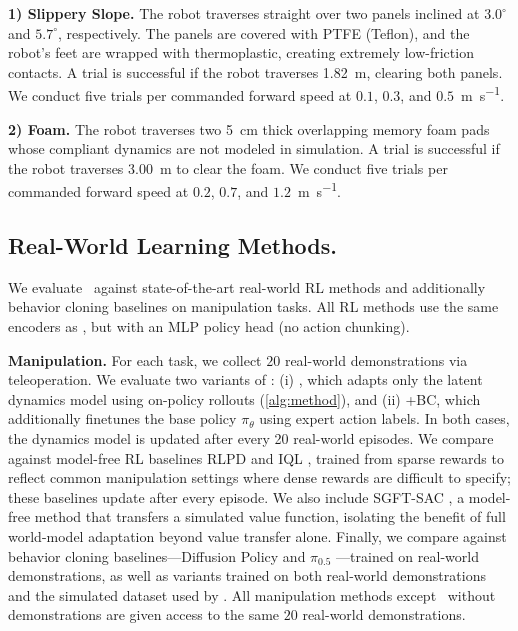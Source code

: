 \begin{hangingpar}
\textbf{1) Slippery Slope.} The robot traverses straight over two panels inclined at $3.0^\circ$ and $5.7^\circ$, respectively. The panels are covered with PTFE (Teflon), and the robot’s feet are wrapped with thermoplastic, creating extremely low-friction contacts. A trial is successful if the robot traverses \SI{1.82}{\meter}, clearing both panels. We conduct five trials per commanded forward speed at $0.1$, $0.3$, and $0.5$~\si{\meter\per\second}.
\end{hangingpar}

\begin{hangingpar}
\textbf{2) Foam.} The robot traverses two \SI{5}{\cm} thick overlapping memory foam pads whose compliant dynamics are not modeled in simulation. A trial is  successful if the robot traverses \SI{3.00}{\meter} to clear the foam. We conduct five trials per commanded forward speed at $0.2$, $0.7$, and $1.2$~\si{\meter\per\second}.
\end{hangingpar}

\subsection{Real-World Learning Methods.}

We evaluate \Method\ against state-of-the-art real-world RL methods and additionally behavior cloning baselines on manipulation tasks. All RL methods use the same encoders as \Method, but with an MLP policy head (no action chunking). 

\textbf{Manipulation.}
For each task, we collect $20$ real-world demonstrations via teleoperation. We evaluate two variants of \Method: (i) \Method, which adapts only the latent dynamics model using on-policy rollouts (\cref{alg:method}), and (ii) \Method+BC, which additionally finetunes the base policy $\pi_\theta$ using expert action labels. In both cases, the dynamics model is updated after every 20 real-world episodes. We compare against model-free RL baselines RLPD \cite{rlpd} and IQL \cite{kostrikovoffline}, trained from sparse rewards to reflect common manipulation settings where dense rewards are difficult to specify; these baselines update after every episode. We also include SGFT-SAC \cite{yin2025rapidly}, a model-free method that transfers a simulated value function, isolating the benefit of full world-model adaptation beyond value transfer alone. Finally, we compare against behavior cloning baselines—Diffusion Policy \cite{chi2024diffusionpolicy} and $\pi_{0.5}$ \cite{intelligence2025pi05}—trained on real-world demonstrations, as well as variants trained on both real-world demonstrations and the simulated dataset used by \Method. All manipulation methods except \Method\ without demonstrations are given access to the same $20$ real-world demonstrations.

